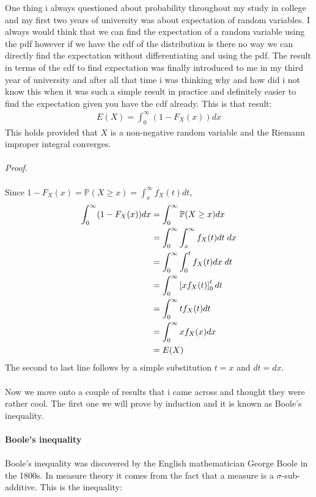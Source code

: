 \documentclass[,oneside]{article}
\begin{document}
\begin{enumerate}
One thing i always questioned about probability throughout my study in college and my first two years of university was about expectation of random variables. I always would think that we can find the expectation of a random variable using the pdf however if we have the cdf of the distribution is there no way we can directly find the expectation without differentiating and using the pdf. The result in terms of the cdf to find expectation was finally introduced to me in my third year of university and after all that time i was thinking why and how did i not know this when it was such a simple result in practice and definitely easier to find the expectation given you have the cdf already. This is that result:
\begin{align*}
E(X)=\int_{0}^{\infty}(1-F_X(x))dx
\end{align*}
This holds provided that $X$ is a non-negative random variable and the Riemann improper integral converges. \\ \\
\textit{Proof.}\\ \\
Since $1-F_X(x)=\mathbb{P}(X \geq x)=\int_{x}^{\infty} f_X(t)dt$,
\begin{align*}
\int_{0}^{\infty} (1-F_X(x))dx &= \int_{0}^{\infty} \mathbb{P}(X \geq x)dx\\
&= \int_{0}^{\infty} \int_{x}^{\infty} f_X(t)dt\hspace{0.1cm}dx\\
&= \int_{0}^{\infty} \int_{0}^{t} f_X(t)dx\hspace{0.1cm}dt\\
&= \int_{0}^{\infty} \left [ xf_X(t)\right ]_0^t dt \\
&= \int_{0}^{\infty} t f_X(t)dt\\
&= \int_{0}^{\infty} x f_X(x)dx\\
&= E(X)
\end{align*}
The second to last line follows by a simple substitution $t=x$ and $dt=dx$. \\ \\Now we move onto a couple of results that i came across and thought they were rather cool. The first one we will prove by induction and it is known as Boole's inequality.\\ \\
\textbf{Boole's inequality} \\ \\
Boole's inequality was discovered by the English mathematician George Boole in the 1800s. In measure theory it comes from the fact that a measure is a $\sigma$-sub-additive. This is the inequality:

\end{enumerate}
\end{document}
